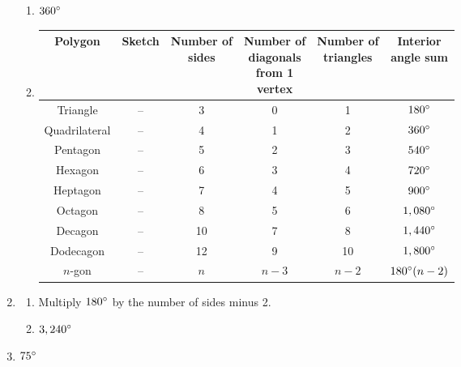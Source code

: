 \documentclass{article}
\begin{document}
\begin{enumerate}
	\begin{enumerate}
	
	\item $360 \degree$
	
	\item \phantom{x}
	
		\begin{center}
		\begin{tabular}{| c | c | c | c | c | c |}
		\hline
		Polygon & Sketch & \makecell{Number of\\sides} & \makecell{Number of\\diagonals\\from 1\\vertex} & \makecell{Number of\\triangles} & \makecell{Interior\\angle sum} \\
		\hline
		Triangle & -- & 3 & 0 & 1 & $180\degree$ \\
		\hline
		Quadrilateral & -- & 4 & 1 & 2 & $360 \degree$ \\
		\hline
		Pentagon & -- & 5 & 2 & 3 & $540 \degree$ \\
		\hline
		Hexagon & -- & 6 & 3 & 4 & $720 \degree$ \\
		\hline
		Heptagon & -- & 7 & 4 & 5 & $900 \degree$ \\
		\hline
		Octagon & -- & 8 & 5 & 6 & $1,080 \degree$ \\
		\hline
		Decagon & -- & 10 & 7 & 8 & $1,440 \degree$ \\
		\hline
		Dodecagon & -- & 12 & 9 & 10 & $1,800 \degree$ \\
		\hline
		$n$-gon & -- & $n$ & $n - 3$ & $n-2$ & $180 \degree (n - 2)$ \\
		\hline
		\end{tabular}
		\end{center}
	
	\end{enumerate}
	
\item

	\begin{enumerate}
	
	\item Multiply $180\degree$ by the number of sides minus 2.
	
	\item $3,240\degree$
	
	\end{enumerate}
	
\item $75 \degree$


\end{enumerate}
\end{document}
